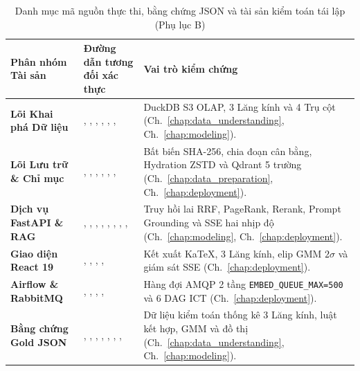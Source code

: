 \begin{table}[htbp]
  \centering
  \footnotesize
  \caption[Danh mục mã nguồn, bằng chứng và tài sản kiểm toán toàn dự án]{Danh mục mã nguồn thực thi, bằng chứng JSON và tài sản kiểm toán tái lập (Phụ lục B)}
  \vspace{4pt}
  \setlength{\tabcolsep}{2.5pt}
  \begin{tabularx}{\linewidth}{|>{\raggedright\arraybackslash}p{30mm}|>{\raggedright\arraybackslash}p{74mm}|L|}
    \hline
    \textbf{Phân nhóm Tài sản} & \textbf{Đường dẫn tương đối xác thực} & \textbf{Vai trò kiểm chứng} \\
    \hline
    \textbf{Lõi Khai phá Dữ liệu} & , , , , , ,  & DuckDB S3 OLAP, 3 Lăng kính và 4 Trụ cột (Ch.~\ref{chap:data_understanding}, Ch.~\ref{chap:modeling}). \\
    \hline
    \textbf{Lõi Lưu trữ \& Chỉ mục} & , , , , , ,  & Bất biến SHA-256, chia đoạn cân bằng, Hydration ZSTD và Qdrant 5 trường (Ch.~\ref{chap:data_preparation}, Ch.~\ref{chap:deployment}). \\
    \hline
    \textbf{Dịch vụ FastAPI \& RAG} & , , , , , , , ,  & Truy hồi lai RRF, PageRank, Rerank, Prompt Grounding và SSE hai nhịp độ (Ch.~\ref{chap:modeling}, Ch.~\ref{chap:deployment}). \\
    \hline
    \textbf{Giao diện React 19} & , , , ,  & Kết xuất KaTeX, 3 Lăng kính, elip GMM $2\sigma$ và giám sát SSE (Ch.~\ref{chap:deployment}). \\
    \hline
    \textbf{Airflow \& RabbitMQ} & , , , ,  & Hàng đợi AMQP 2 tầng \texttt{EMBED\_QUEUE\_MAX=500} và 6 DAG ICT (Ch.~\ref{chap:deployment}). \\
    \hline
    \textbf{Bằng chứng Gold JSON} & , , , , , , ,  & Dữ liệu kiểm toán thống kê 3 Lăng kính, luật kết hợp, GMM và đồ thị (Ch.~\ref{chap:data_understanding}, Ch.~\ref{chap:modeling}). \\

\end{tabularx}
\end{table}
